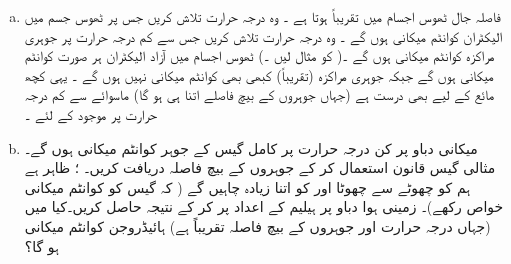 \begin{enumerate}[a.]
\item
{}\quad
  فاصلہ جال  ٹھوس اجسام میں   تقریباً  ہوتا ہے ۔ وہ درجہ حرارت تلاش کریں  جس پر  ٹھوس جسم میں    الیکٹران  کوانٹم میکانی  ہوں گے ۔ وہ درجہ حرارت تلاش کریں جس سے کم درجہ حرارت پر  جوہری مراکزہ  کوانٹم میکانی  ہوں گے ۔( کو   مثال  لیں ۔) \quad 
ٹھوس اجسام میں آزاد  الیکٹران ہر صورت کوانٹم میکانی ہوں گے  جبکہ جوہری  مراکزہ (تقریباً) کبھی بھی کوانٹم میکانی نہیں ہوں گے ۔ یہی  کچھ  مائع  کے لیے بھی درست ہے (جہاں جوہروں  کے بیچ فاصلے اتنا ہی ہو گا)   ماسوائے   سے کم درجہ حرارت پر موجود  کے  لئے ۔
\item
{} میکانی دباو  پر کن  درجہ حرارت پر کامل گیس کے جوہر کوانٹم میکانی ہوں گے۔     \quad
مثالی گیس  قانون   استعمال کر کے  جوہروں کے بیچ فاصلہ دریافت کریں۔ \quad
{}  ؛  ظاہر ہے  ہم  کو چھوٹے سے چھوٹا  اور  کو اتنا  زیادہ چاہیں گے (  کہ  گیس کو کوانٹم میکانی خواص رکھے)۔  زمینی ہوا  دباو پر ہیلیم  کے اعداد پر کر کے نتیجہ حاصل کریں۔کیا    میں (جہاں درجہ حرارت  اور جوہروں کے بیچ فاصلہ تقریباً    ہے)  ہائیڈروجن  کوانٹم میکانی ہو گا؟  
\end{enumerate}
